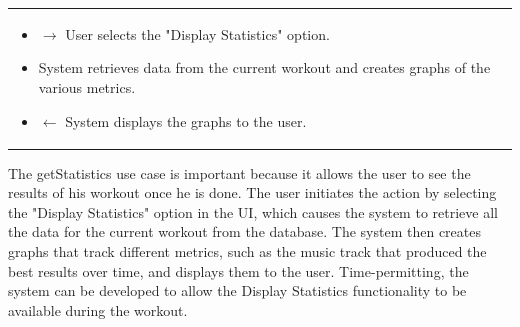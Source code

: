 \documentclass[letterpaper,english, 12pt]{scrreprt}
\begin{document}
\begin{center}
\begin{tabular}{|C{15cm}|}
\begin{itemize}
                                        \item $\rightarrow$ User selects the "Display Statistics" option.
                                        \item System retrieves data from the current workout and creates graphs of the various metrics.
                                        \item $\leftarrow$ System displays the graphs to the user.
                                \end{itemize}
                \hline
        \end{tabular}
\end{center}

The getStatistics use case is important because it allows the user to see the results of his workout once he is done. The user initiates the action by selecting the "Display Statistics" option in the UI, which causes the system to retrieve all the data for the current workout from the database. The system then creates graphs that track different metrics, such as the music track that produced the best results over time, and displays them to the user. Time-permitting, the system can be developed to allow the Display Statistics functionality to be available during the workout.
\end{document}
